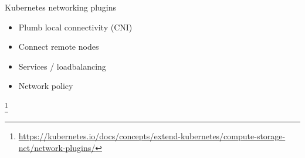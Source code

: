 \documentclass[black,white]{beamer}
\newcommand\blfootnote[1]{%
  \begingroup
  \renewcommand\thefootnote{}\footnote{#1}%
  \addtocounter{footnote}{-1}%
  \endgroup
}
\DeclareRobustCommand{\#}{\adjustbox{valign=B,totalheight=.57\baselineskip}{\oldhash}}%
\begin{document}
    \begin{frame}{Kubernetes networking plugins}
        \begin{table}
            \begin{subtable}[l]{0.6\textwidth}
                \begin{itemize}
                    \item Plumb local connectivity (CNI) \medskip
                    \item Connect remote nodes \medskip
                    \item Services / loadbalancing \medskip
                    \item Network policy \medskip
                \end{itemize}
            \end{subtable}
            \begin{subtable}[r]{0.35\textwidth}
                \begin{figure}
                    
                \end{figure}
            \end{subtable}
        \end{table}
        \blfootnote{{\tiny \url{https://kubernetes.io/docs/concepts/extend-kubernetes/compute-storage-net/network-plugins/}}}
    \end{frame}
\end{document}

